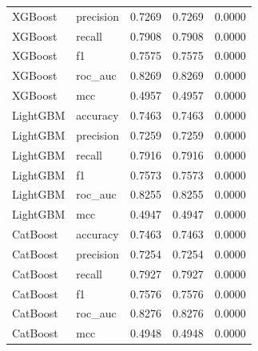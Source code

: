 \begin{tabular}{llrrr}
XGBoost & precision & 0.7269 & 0.7269 & 0.0000 \\
XGBoost & recall & 0.7908 & 0.7908 & 0.0000 \\
XGBoost & f1 & 0.7575 & 0.7575 & 0.0000 \\
XGBoost & roc\_auc & 0.8269 & 0.8269 & 0.0000 \\
XGBoost & mcc & 0.4957 & 0.4957 & 0.0000 \\
LightGBM & accuracy & 0.7463 & 0.7463 & 0.0000 \\
LightGBM & precision & 0.7259 & 0.7259 & 0.0000 \\
LightGBM & recall & 0.7916 & 0.7916 & 0.0000 \\
LightGBM & f1 & 0.7573 & 0.7573 & 0.0000 \\
LightGBM & roc\_auc & 0.8255 & 0.8255 & 0.0000 \\
LightGBM & mcc & 0.4947 & 0.4947 & 0.0000 \\
CatBoost & accuracy & 0.7463 & 0.7463 & 0.0000 \\
CatBoost & precision & 0.7254 & 0.7254 & 0.0000 \\
CatBoost & recall & 0.7927 & 0.7927 & 0.0000 \\
CatBoost & f1 & 0.7576 & 0.7576 & 0.0000 \\
CatBoost & roc\_auc & 0.8276 & 0.8276 & 0.0000 \\
CatBoost & mcc & 0.4948 & 0.4948 & 0.0000 \\
\bottomrule
\end{tabular}
